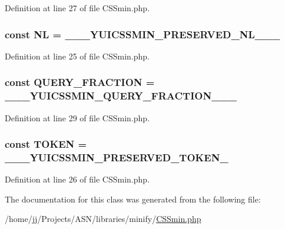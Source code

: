 Definition at line 27 of file C\+S\+Smin.\+php.

\subsubsection[{\texorpdfstring{NL}{NL}}]{\setlength{\rightskip}{0pt plus 5cm}const NL = \textquotesingle{}\+\_\+\+\_\+\+\_\+\+Y\+U\+I\+C\+S\+S\+M\+I\+N\+\_\+\+P\+R\+E\+S\+E\+R\+V\+E\+D\+\_\+\+N\+L\+\_\+\+\_\+\+\_\+\textquotesingle{}}\hypertarget{class_c_s_smin_a3948c042f5024ab0264a5413294eff6a}{}\label{class_c_s_smin_a3948c042f5024ab0264a5413294eff6a}


Definition at line 25 of file C\+S\+Smin.\+php.

\subsubsection[{\texorpdfstring{Q\+U\+E\+R\+Y\+\_\+\+F\+R\+A\+C\+T\+I\+ON}{QUERY_FRACTION}}]{\setlength{\rightskip}{0pt plus 5cm}const Q\+U\+E\+R\+Y\+\_\+\+F\+R\+A\+C\+T\+I\+ON = \textquotesingle{}\+\_\+\+\_\+\+\_\+\+Y\+U\+I\+C\+S\+S\+M\+I\+N\+\_\+\+Q\+U\+E\+R\+Y\+\_\+\+F\+R\+A\+C\+T\+I\+O\+N\+\_\+\+\_\+\+\_\+\textquotesingle{}}\hypertarget{class_c_s_smin_adb89044faa7ff89d1518705934a4c008}{}\label{class_c_s_smin_adb89044faa7ff89d1518705934a4c008}


Definition at line 29 of file C\+S\+Smin.\+php.

\subsubsection[{\texorpdfstring{T\+O\+K\+EN}{TOKEN}}]{\setlength{\rightskip}{0pt plus 5cm}const T\+O\+K\+EN = \textquotesingle{}\+\_\+\+\_\+\+\_\+\+Y\+U\+I\+C\+S\+S\+M\+I\+N\+\_\+\+P\+R\+E\+S\+E\+R\+V\+E\+D\+\_\+\+T\+O\+K\+E\+N\+\_\+\textquotesingle{}}\hypertarget{class_c_s_smin_a532b722025b61ca3bb2155401be4b24e}{}\label{class_c_s_smin_a532b722025b61ca3bb2155401be4b24e}


Definition at line 26 of file C\+S\+Smin.\+php.



The documentation for this class was generated from the following file\+:\begin{DoxyCompactItemize}
\item 
/home/jj/\+Projects/\+A\+S\+N/libraries/minify/\hyperlink{_c_s_smin_8php}{C\+S\+Smin.\+php}\end{DoxyCompactItemize}
